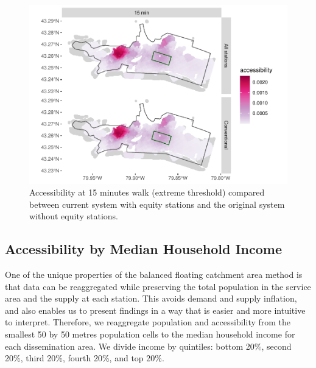 \documentclass[]{elsarticle} %
\begin{document}
\begin{figure}

{\centering \includegraphics[width=0.9\linewidth]{Bike-share-spatial-equity_files/figure-latex/figure-9-1} 

}

\caption{Accessibility at 15 minutes walk (extreme threshold) compared between current system with equity stations and the original system without equity stations.}\label{fig:figure-9}
\end{figure}

\hypertarget{accessibility-by-median-household-income}{%
\subsection{Accessibility by Median Household
Income}\label{accessibility-by-median-household-income}}

One of the unique properties of the balanced floating catchment area
method is that data can be reaggregated while preserving the total
population in the service area and the supply at each station. This
avoids demand and supply inflation, and also enables us to present
findings in a way that is easier and more intuitive to interpret.
Therefore, we reaggregate population and accessibility from the smallest
50 by 50 metres population cells to the median household income for each
dissemination area. We divide income by quintiles: bottom 20\%, second
20\%, third 20\%, fourth 20\%, and top 20\%.
\end{document}
